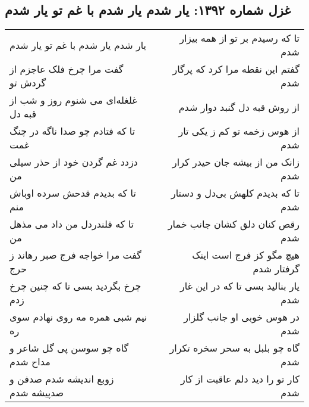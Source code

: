 \begin{center}
\section*{غزل شماره ۱۳۹۲: یار شدم یار شدم با غم تو یار شدم}
\label{sec:1392}
\begin{longtable}{l p{0.5cm} r}
یار شدم یار شدم با غم تو یار شدم
&&
تا که رسیدم بر تو از همه بیزار شدم
\\
گفت مرا چرخ فلک عاجزم از گردش تو
&&
گفتم این نقطه مرا کرد که پرگار شدم
\\
غلغله‌ای می شنوم روز و شب از قبه دل
&&
از روش قبه دل گنبد دوار شدم
\\
تا که فتادم چو صدا ناگه در چنگ غمت
&&
از هوس زخمه تو کم ز یکی تار شدم
\\
دزدد غم گردن خود از حذر سیلی من
&&
زانک من از بیشه جان حیدر کرار شدم
\\
تا که بدیدم قدحش سرده اوباش منم
&&
تا که بدیدم کلهش بی‌دل و دستار شدم
\\
تا که قلندردل من داد می مذهل من
&&
رقص کنان دلق کشان جانب خمار شدم
\\
گفت مرا خواجه فرج صبر رهاند ز حرج
&&
هیچ مگو کز فرج است اینک گرفتار شدم
\\
چرخ بگردید بسی تا که چنین چرخ زدم
&&
یار بنالید بسی تا که در این غار شدم
\\
نیم شبی همره مه روی نهادم سوی ره
&&
در هوس خوبی او جانب گلزار شدم
\\
گاه چو سوسن پی گل شاعر و مداح شدم
&&
گاه چو بلبل به سحر سخره تکرار شدم
\\
زوبع اندیشه شدم صدفن و صدپیشه شدم
&&
کار تو را دید دلم عاقبت از کار شدم
\\
\end{longtable}
\end{center}

